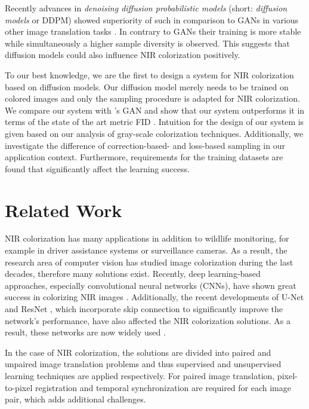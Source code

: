 Recently advances in \textit{denoising diffusion probabilistic models} (short: \textit{diffusion models} or DDPM) \parencite{ddpm} showed superiority of such in comparison to GANs in various other image translation tasks \parencite{diffusion-beats-gans,sbgm}.
In contrary to GANs their training is more stable while simultaneously a higher sample diversity is observed.
This suggests that diffusion models could also influence NIR colorization positively.

To our best knowledge, we are the first to design a system for NIR colorization based on diffusion models.
Our diffusion model merely needs to be trained on colored images and only the sampling procedure is adapted for NIR colorization.
We compare our system with \textcite{mehri}'s GAN and show that our system outperforms it in terms of the state of the art metric FID \parencite{ttur}.
Intuition for the design of our system is given based on our analysis of gray-scale colorization techniques.
Additionally, we investigate the difference of correction-based- and loss-based sampling in our application
context.
Furthermore, requirements for the training datasets are found that significantly affect the learning success.

\section{Related Work}
NIR colorization has many applications in addition to wildlife monitoring, for example in driver assistance systems or surveillance cameras.
As a result, the research area of computer vision has studied image colorization during the last decades, therefore many solutions exist.
Recently, deep learning-based approaches, especially convolutional neural networks (CNNs), have shown great success in colorizing NIR images \parencite{limmer}.
Additionally, the recent developments of U-Net \parencite{unet} and ResNet \parencite{resnet}, which incorporate skip connection to significantly improve the network's performance, have also affected
the NIR colorization solutions. As a result, these networks are now widely used \parencite{cyclegan-original,mehri,cut,s-shape}.

In the case of NIR colorization, the solutions are divided into paired and unpaired image translation problems and thus supervised and unsupervised learning techniques are applied respectively.
For paired image translation, pixel-to-pixel registration and temporal synchronization are required for each image pair, which adds additional challenges.


